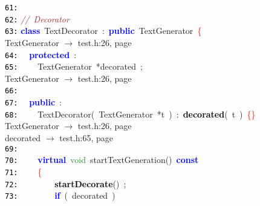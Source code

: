 \documentclass{article}
\begin{document}
\mbox{}\texttt{\textcolor{Black}{61:}}  \\
\mbox{}\texttt{\textcolor{Black}{62:}} \textit{\textcolor{Brown}{//\ Decorator}} \\
\mbox{}\texttt{\textcolor{Black}{63:}} \textbf{\textcolor{Blue}{class}}\ \label{test.h:63}TextDecorator\ \textcolor{BrickRed}{:}\ \textbf{\textcolor{Blue}{public}}\ TextGenerator\ \textcolor{Red}{\{} \\
\mbox{}{\hfill TextGenerator $\rightarrow$ test.h:26, page~\pageref{test.h:26}} \\
\mbox{}\texttt{\textcolor{Black}{64:}} \ \ \textbf{\textcolor{Blue}{protected}}\ \textcolor{BrickRed}{:} \\
\mbox{}\texttt{\textcolor{Black}{65:}} \ \ \ \ TextGenerator\ \textcolor{BrickRed}{*}\label{test.h:65}decorated\ \textcolor{BrickRed}{;} \\
\mbox{}{\hfill TextGenerator $\rightarrow$ test.h:26, page~\pageref{test.h:26}} \\
\mbox{}\texttt{\textcolor{Black}{66:}} \ \  \\
\mbox{}\texttt{\textcolor{Black}{67:}} \ \ \textbf{\textcolor{Blue}{public}}\ \textcolor{BrickRed}{:} \\
\mbox{}\texttt{\textcolor{Black}{68:}} \ \ \ \ \label{test.h:68}TextDecorator\textcolor{BrickRed}{(}\ TextGenerator\ \textcolor{BrickRed}{*}t\ \textcolor{BrickRed}{)}\ \textcolor{BrickRed}{:}\ \textbf{\textcolor{Black}{decorated}}\textcolor{BrickRed}{(}\ t\ \textcolor{BrickRed}{)}\ \textcolor{Red}{\{\}} \\
\mbox{}{\hfill TextGenerator $\rightarrow$ test.h:26, page~\pageref{test.h:26}} \\
\mbox{}{\hfill decorated $\rightarrow$ test.h:65, page~\pageref{test.h:65}} \\
\mbox{}\texttt{\textcolor{Black}{69:}}  \\
\mbox{}\texttt{\textcolor{Black}{70:}} \ \ \ \ \textbf{\textcolor{Blue}{virtual}}\ \textcolor{ForestGreen}{void}\ \label{test.h:70}startTextGeneration\textcolor{BrickRed}{()}\ \textbf{\textcolor{Blue}{const}}\  \\
\mbox{}\texttt{\textcolor{Black}{71:}} \ \ \ \ \textcolor{Red}{\{}\  \\
\mbox{}\texttt{\textcolor{Black}{72:}} \ \ \ \ \ \ \ \ \textbf{\textcolor{Black}{startDecorate}}\textcolor{BrickRed}{()}\ \textcolor{BrickRed}{;} \\
\mbox{}\texttt{\textcolor{Black}{73:}} \ \ \ \ \ \ \ \ \textbf{\textcolor{Blue}{if}}\ \textcolor{BrickRed}{(}\ decorated\ \textcolor{BrickRed}{)} \\
\end{document}

